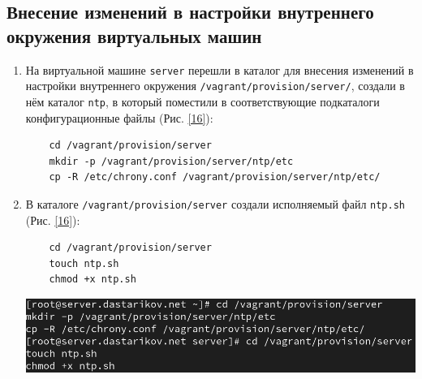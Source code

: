 \subsection{Внесение изменений в настройки внутреннего окружения виртуальных машин}
\begin{enumerate}
\item На виртуальной машине \texttt{server} перешли в каталог для внесения изменений в настройки внутреннего окружения \texttt{/vagrant/provision/server/}, создали в нём каталог \texttt{ntp}, в который поместили в соответствующие подкаталоги конфигурационные файлы (Рис. \ref{16}):
  \begin{verbatim}
    cd /vagrant/provision/server
    mkdir -p /vagrant/provision/server/ntp/etc
    cp -R /etc/chrony.conf /vagrant/provision/server/ntp/etc/
  \end{verbatim}
\item В каталоге \texttt{/vagrant/provision/server} создали исполняемый файл \texttt{ntp.sh} (Рис. \ref{16}):
  \begin{verbatim}
    cd /vagrant/provision/server
    touch ntp.sh
    chmod +x ntp.sh
  \end{verbatim}
\begin{center}
    \centering
    \includegraphics[width=\textwidth]{../images/image16.png}
    \label{16}
\end{center}


\end{enumerate}

